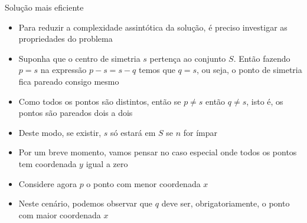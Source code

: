 \begin{frame}[fragile]{Solução mais eficiente}

    \begin{itemize}
        \item Para reduzir a complexidade assintótica da solução, é preciso investigar as
            propriedades do problema

        \item Suponha que o centro de simetria $s$ pertença ao conjunto $S$. Então fazendo $p = s$
            na expressão $p - s = s - q$ temos que $q = s$, ou seja, o ponto de simetria fica
            pareado consigo mesmo

        \item Como todos os pontos são distintos, então se $p\neq s$ então $q\neq s$, isto é,
            os pontos são pareados dois a dois

        \item Deste modo, se existir, $s$ só estará em $S$ se $n$ for ímpar

        \item Por um breve momento, vamos pensar no caso especial onde todos os pontos tem
            coordenada $y$ igual a zero

        \item Considere agora $p$ o ponto com menor coordenada $x$

        \item Neste cenário, podemos observar que $q$ deve ser, obrigatoriamente, o ponto com
            maior coordenada $x$
    \end{itemize}

\end{frame}

